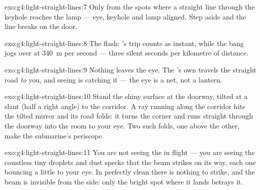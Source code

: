 \begin{solution}{exo:g4:light-straight-lines:7}
Only from the spots where a straight line through the keyhole
reaches the lamp --- eye, keyhole and lamp aligned. Step aside and
the line breaks on the door.
\end{solution}

\begin{solution}{exo:g4:light-straight-lines:8}
The flash: 's trip counts as instant, while the bang jogs over
at \qty{340}{m} per second --- three silent seconds per kilometre
of distance.
\end{solution}

\begin{solution}{exo:g4:light-straight-lines:9}
Nothing leaves the eye. The 's own  travels the straight
road \emph{to} you, and seeing is catching it --- the eye is a net,
not a lantern.
\end{solution}

\begin{solution}{exo:g4:light-straight-lines:10}
Stand the shiny surface at the doorway, tilted at a slant (half a
right angle) to the corridor. A ray running along the corridor hits
the tilted mirror and its road folds: it turns the corner and runs
straight through the doorway into the room to your eye. Two such
folds, one above the other, make the submarine's periscope.
\end{solution}

\begin{solution}{exo:g4:light-straight-lines:11}
You are not seeing the  in flight --- you are seeing the
countless tiny droplets and dust specks that the beam strikes on
its way, each one bouncing a little  to your eye. In perfectly
clean  there is nothing to strike, and the beam is invisible
from the side: only the bright spot where it lands betrays it.
\end{solution}
